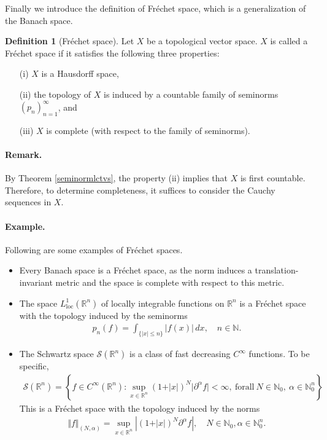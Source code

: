\documentclass{article}
\numberwithin{equation}{section}
\newcommand{\bbN}{\mathbb{N}}
\newcommand{\bbR}{\mathbb{R}}
\renewcommand{\cal}{\mathcal}
\newcommand{\loc}{\mathrm{loc}}
\theoremstyle{plain}
\theoremstyle{definition}
\newtheorem{definition}[theorem]{Definition}
\begin{document}
Finally we introduce the definition of Fréchet space, which is a generalization of the Banach space.
\begin{definition}[Fréchet space]
Let $X$ be a topological vector space. $X$ is called a Fréchet space if it satisfies the following three properties:
\begin{itemize}
	\item[(i)] $X$ is a Hausdorff space,
	\item[(ii)] the topology of $X$ is induced by a countable family of seminorms $(p_n)_{n=1}^\infty$, and
	\item[(iii)] $X$ is complete (with respect to the family of seminorms).
\end{itemize}
\end{definition}
\paragraph{Remark.} By Theorem \ref{seminormlctvs}, the property (ii) implies that $X$ is first countable. Therefore, to determine completeness, it suffices to consider the Cauchy sequences in $X$.

\paragraph{Example.} Following are some examples of Fréchet spaces.
\begin{itemize}
\item Every Banach space is a Fréchet space, as the norm induces a translation-invariant metric and the space is complete with respect to this metric.
\item The space $L^1_\loc(\bbR^n)$ of locally integrable functions on $\bbR^n$ is a Fréchet space with the topology induced by the seminorms
\begin{align*}
	p_n(f)=\int_{\{\vert x\vert\leq n\}}\vert f(x)\vert\,dx,\quad n\in\bbN.
\end{align*}
\item The Schwartz space $\cal{S}(\bbR^n)$ is a class of fast decreasing $C^\infty$ functions. To be specific,
\begin{align*}
	\cal{S}(\bbR^n)=\left\{f\in C^\infty(\bbR^n):\sup_{x\in\bbR^n}(1+\vert x\vert)^N\vert\partial^\alpha f\vert<\infty,\ \mathrm{for all}\ N\in\bbN_0,\ \alpha\in\bbN_0^n\right\}
\end{align*}
This is a Fréchet space with the topology induced by the norms
\begin{align*}
	\Vert f\Vert_{(N,\alpha)}=\sup_{x\in\bbR^n}\left\vert(1+\vert x\vert)^N\partial^\alpha f\right\vert,\quad N\in\bbN_0,\alpha\in\bbN_0^n.
\end{align*}
\end{itemize}
\end{document}
